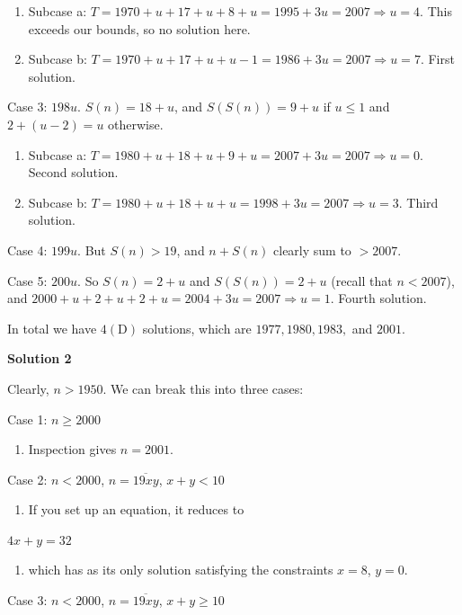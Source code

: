 \begin{enumerate}
 
            \begin{enumerate}[label=(\roman*)]
                \item Subcase a: $T = 1970 + u + 17 + u + 8 + u = 1995 + 3u = 2007 \Longrightarrow u = 4$. This exceeds our bounds, so no solution here.\item Subcase b: $T = 1970 + u + 17 + u + u - 1 = 1986 + 3u = 2007 \Longrightarrow u = 7$. First solution.
            \end{enumerate}
            Case 3: $198u$. $S(n) = 18 + u$, and $S(S(n)) = 9 + u$ if $u \le 1$ and $2 + (u-2) = u$ otherwise.

 
            \begin{enumerate}[label=(\roman*)]
                \item Subcase a: $T = 1980 + u + 18 + u + 9 + u = 2007 + 3u = 2007 \Longrightarrow u = 0$. Second solution.\item Subcase b: $T = 1980 + u + 18 + u + u = 1998 + 3u = 2007 \Longrightarrow u = 3$. Third solution.
            \end{enumerate}
            Case 4: $199u$. But $S(n) > 19$, and $n + S(n)$ clearly sum to $> 2007$.

 Case 5: $200u$. So $S(n) = 2 + u$ and $S(S(n)) = 2 + u$ (recall that $n < 2007$), and $2000 + u + 2 + u + 2 + u = 2004 + 3u = 2007 \Longrightarrow u = 1$. Fourth solution.

 In total we have $4 \mathrm{(D)}$ solutions, which are $1977, 1980, 1983,$ and $2001$.

 



\textbf{Solution 2}

Clearly, $n > 1950$. We can break this into three cases:

 Case 1: $n \geq 2000$

 
            \begin{enumerate}[label=(\roman*)]
                \item Inspection gives $n = 2001$.
            \end{enumerate}
            Case 2: $n < 2000$, $n = \overline{19xy}$, $x + y < 10$

 
            \begin{enumerate}[label=(\roman*)]
                \item If you set up an equation, it reduces to
            \end{enumerate}
            $4x + y = 32$

 
            \begin{enumerate}[label=(\roman*)]
                \item which has as its only solution satisfying the constraints $x = 8$, $y = 0$.
            \end{enumerate}
            Case 3: $n < 2000$, $n = \overline{19xy}$, $x + y \geq 10$


\end{enumerate}
